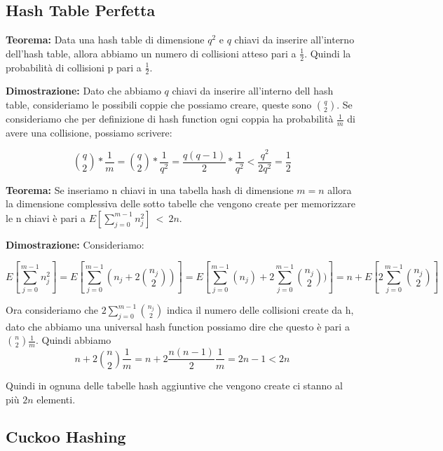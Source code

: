 \documentclass[12pt]{article}
\begin{document}
\subsection{Hash Table Perfetta}


\textbf{Teorema:} Data una hash table di dimensione $q^2$ e $q$ chiavi da inserire all'interno dell'hash table, allora abbiamo un numero di collisioni atteso pari a $\frac{1}{2}$. Quindi la probabilità di collisioni p pari a $\frac{1}{2}$.

\textbf{Dimostrazione:} Dato che abbiamo $q$ chiavi da inserire all'interno dell hash table, consideriamo le possibili coppie che possiamo creare, queste sono $\binom{q}{2}$. 
Se consideriamo che per definizione di hash function ogni coppia ha probabilità $\frac{1}{m}$ di avere una collisione, possiamo scrivere:

\begin{equation}
\binom{q}{2}*\frac{1}{m} = \binom{q}{2}*\frac{1}{q^2} = \frac{q(q-1)}{2}*\frac{1}{q^2} < \frac{q^2}{2q^2} = \frac{1}{2}
\end{equation}


\textbf{Teorema:} Se inseriamo n chiavi in una tabella hash di dimensione $m=n$ allora la dimensione complessiva delle sotto tabelle che vengono create per memorizzare le n chiavi è pari a $E[\sum^{m-1}_{j=0}n_j^2]\ <\ 2n$.

\textbf{Dimostrazione:} Consideriamo:

\begin{equation}
E[\sum^{m-1}_{j=0}n_j^2] = E[\sum^{m-1}_{j=0}(n_j + 2\binom{n_j}{2})] = E[\sum^{m-1}_{j=0}(n_j) + 2\sum^{m-1}_{j=0}\binom{n_j}{2})] = n + E[2\sum^{m-1}_{j=0}\binom{n_j}{2}]
\end{equation}

Ora consideriamo che $2\sum^{m-1}_{j=0}\binom{n_j}{2}$ indica il numero delle collisioni create da h, dato che abbiamo una universal hash function possiamo dire che questo è pari a $\binom{n}{2}\frac{1}{m}$. Quindi abbiamo 
\begin{equation}
n + 2\binom{n}{2}\frac{1}{m} = n + 2\frac{n(n-1)}{2}\frac{1}{m} = 2n-1 < 2n
\end{equation}

Quindi in ognuna delle tabelle hash aggiuntive che vengono create ci stanno al più $2n$ elementi.

\subsection{Cuckoo Hashing}
\end{document}
